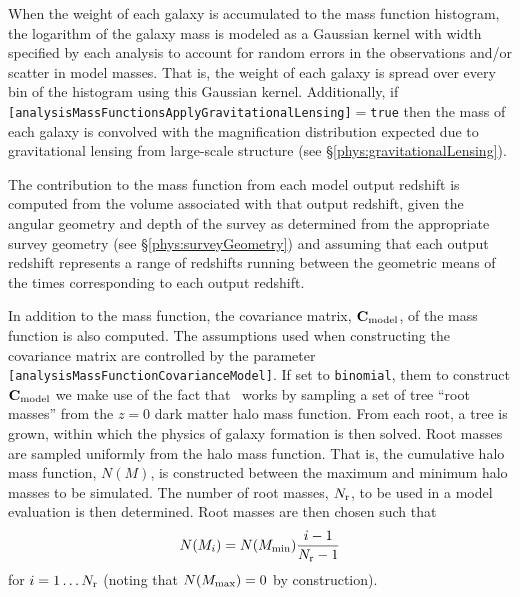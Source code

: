 When the weight of each galaxy is accumulated to the mass function histogram, the logarithm of the galaxy mass is modeled as a Gaussian kernel with width specified by each analysis to account for random errors in the observations and/or scatter in model masses. That is, the weight of each galaxy is spread over every bin of the histogram using this Gaussian kernel. Additionally, if {\tt [analysisMassFunctionsApplyGravitationalLensing]}$=${\tt true} then the mass of each galaxy is convolved with the magnification distribution expected due to gravitational lensing from large-scale structure (see \S\ref{phys:gravitationalLensing}).

The contribution to the mass function from each model output redshift is computed from the volume associated with that output redshift, given the angular geometry and depth of the survey as determined from the appropriate survey geometry (see \S\ref{phys:surveyGeometry}) and assuming that each output redshift represents a range of redshifts running between the geometric means of the times corresponding to each output redshift. 

In addition to the mass function, the covariance matrix, ${\bf C}_{\rm model}$, of the mass function is also computed. The assumptions used when constructing the covariance matrix are controlled by the parameter {\tt [analysisMassFunctionCovarianceModel]}. If set to {\tt binomial}, them to construct ${\bf C}_{\rm model}$ we make use of the fact that \glc\ works by sampling a set of tree ``root masses'' from the $z=0$ dark matter halo mass function. From each root, a tree is grown, within which the physics of galaxy formation is then solved. Root masses are sampled uniformly from the halo mass function. That is, the cumulative halo mass function, $N(M)$, is constructed between the maximum and minimum halo masses to be simulated. The number of root masses, $N_{\rm r}$, to be used in a model evaluation is then determined. Root masses are then chosen such that
\begin{equation}
 N(M_i) = N(M_{\rm min}) {i-1 \over N_{\rm r}-1}
\end{equation}
for $i=1\ldots N_{\rm r}$ (noting that $N(M_{\rm max})=0$ by construction). 

